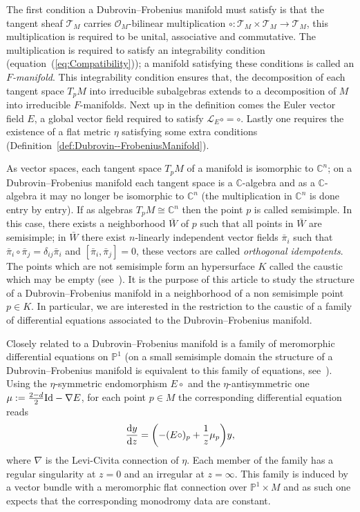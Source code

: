 \documentclass[pdftex]{sigma}
\numberwithin{equation}{section}
\begin{document}
The first condition a Dubrovin--Frobenius manifold must satisfy is that the tangent sheaf $\mathcal{T}_{M}$ carries $\mathcal{O}_{M}$-bilinear multiplication $\circ\colon\mathcal{T}_{M}\times\mathcal{T}_{M}\rightarrow\mathcal{T}_{M}$, this multiplication is required to be unital, associative and commutative. The multiplication is required to satisfy an integrability condition (equation~(\ref{eq:Compatibility})); a manifold satisfying these conditions is called an \emph{$F$-manifold}. This integrability condition ensures that, the decomposition of each tangent space $T_{p}M$ into irreducible subalgebras extends to a decomposition of $M$ into irreducible $F$-manifolds. Next up in the definition comes the Euler vector field $E$, a global vector field required to satisfy $\mathcal{L}_{E}\circ=\circ$. Lastly one requires the existence of a flat metric $\eta$ satisfying some extra conditions (Definition~\ref{def:Dubrovin--FrobeniusManifold}).

As vector spaces, each tangent space $T_{p}M$ of a manifold is isomorphic to $\mathbb{C}^{n}$; on a Dubrovin--Frobenius manifold each tangent space is a $\mathbb{C}$-algebra and as a $\mathbb{C}$-algebra it may no longer be isomorphic to $\mathbb{C}^{n}$ (the multiplication in $\mathbb{C}^{n}$ is done entry by entry). If as algebras $T_{p}M\cong\mathbb{C}^{n}$ then the point $p$ is called semisimple. In this case, there exists a neighborhood $\bar{W}$ of $p$ such that all points in $\bar{W}$ are semisimple; in $\bar{W}$ there exist $n$-linearly independent vector fields $\bar{\pi}_{i}$ such that $\bar{\pi}_{i}\circ\bar{\pi}_{j}=\delta_{ij}\bar{\pi}_{i}$ and $[\bar{\pi}_{i},\bar{\pi}_{j}]=0$, these vectors are called \emph{orthogonal idempotents}. The points which are not semisimple form an hypersurface $K$ called the caustic which may be empty (see~\cite[Proposition 2.6]{HertlingFrobenius}). It is the purpose of this article to study the structure of a Dubrovin--Frobenius manifold in a neighborhood of a non semisimple point $p\in K$. In particular, we are interested in the restriction to the caustic of a family of differential equations associated to the Dubrovin--Frobenius manifold.

Closely related to a Dubrovin--Frobenius manifold is a family of meromorphic differential equations on $\mathbb{P}^{1}$ (on a small semisimple domain the structure of a Dubrovin--Frobenius manifold is equivalent to this family of equations, see~\cite{Dubrovin:1998fe}). Using the $\eta$-symmetric endomorphism $E\circ$ and the $\eta$-antisymmetric one $\mu:=\tfrac{2-d}{2}{\rm Id}-\nabla E$, for each point $p\in M$ the corresponding differential equation reads
\begin{equation*}
 \frac{{\rm d}y}{{\rm d}z}=\biggl(-(E\circ)_{p} +\frac{1}{z}\mu_{p}\biggr)y,
\end{equation*}
where $\nabla$ is the Levi-Civita connection of $\eta$. Each member of the family has a regular singularity at $z=0$ and an irregular at $z=\infty$. This family is induced by a vector bundle with a meromorphic flat connection over $\mathbb{P}^{1}\times M$ and as such one expects that the corresponding monodromy data are constant.
\end{document}
